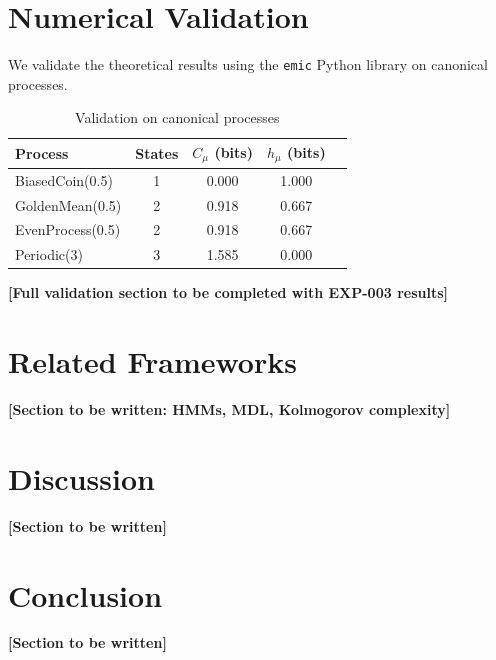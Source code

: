\documentclass[11pt,twocolumn]{article}
\theoremstyle{plain}
\theoremstyle{definition}
\theoremstyle{remark}
\newcommand{\Cmu}{C_\mu}
\newcommand{\hmu}{h_\mu}
\begin{document}
\section{Numerical Validation}
\label{sec:validation}

We validate the theoretical results using the \texttt{emic} Python library on canonical processes.

\begin{table}[h]
\centering
\caption{Validation on canonical processes}
\label{tab:validation}
\begin{tabular}{lcccc}
\toprule
Process & States & $\Cmu$ (bits) & $\hmu$ (bits) \\
\midrule
BiasedCoin(0.5) & 1 & 0.000 & 1.000 \\
GoldenMean(0.5) & 2 & 0.918 & 0.667 \\
EvenProcess(0.5) & 2 & 0.918 & 0.667 \\
Periodic(3) & 3 & 1.585 & 0.000 \\
\bottomrule
\end{tabular}
\end{table}

\textbf{[Full validation section to be completed with EXP-003 results]}

\section{Related Frameworks}
\label{sec:related}

\textbf{[Section to be written: HMMs, MDL, Kolmogorov complexity]}

\section{Discussion}
\label{sec:discussion}

\textbf{[Section to be written]}

\section{Conclusion}
\label{sec:conclusion}

\textbf{[Section to be written]}



\end{document}
